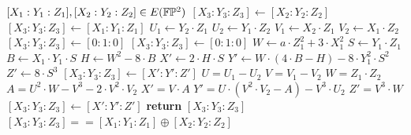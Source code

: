 \begin{algorithm}\caption{Закон сложения в проективной }
\label{alg:projective_group_law}
\begin{algorithmic}[0]
\Require $[X_1:Y_1:Z_1],[X_2:Y_2:Z_2] \in E(\mathbb{F}\mathbb{P}^2)$
\If{$[X_1:Y_1:Z_1] == [0:1:0]$}
  \State $[X_3:Y_3:Z_3] \gets [X_2:Y_2:Z_2]$
\ElsIf{$[X_2:Y_2:Z_2] == [0:1:0]$}
  \State $[X_3:Y_3:Z_3] \gets [X_1:Y_1:Z_1]$
\Else
  \State $U_1 \gets Y_2\cdot Z_1$
  \State $U_2 \gets Y_1\cdot Z_2$
  \State $V_1 \gets X_2\cdot Z_1$
  \State $V_2 \gets X_1\cdot Z_2$
      $[X_3:Y_3:Z_3] \gets [0:1:0]$
    \Else
        $[X_3:Y_3:Z_3] \gets [0:1:0]$
      \Else
        \State $W \gets a\cdot Z_1^2 + 3\cdot X_1^2$
        \State $S \gets Y_1\cdot Z_1$
        \State $B \gets X_1\cdot Y_1\cdot S$
        \State $H \gets W^2 - 8\cdot B$
        \State $X' \gets 2\cdot H\cdot S$
        \State $Y' \gets W\cdot (4\cdot B - H) - 8\cdot Y_1^2\cdot S^2$
        \State $Z' \gets 8\cdot S^3$
        \State $[X_3:Y_3:Z_3] \gets [X':Y':Z']$
      \EndIf
    \EndIf
  \Else
    \State $U = U_1 - U_2$
    \State $V = V_1 - V_2$
    \State $W = Z_1\cdot Z_2$
    \State $A = U^2\cdot W - V^3 - 2\cdot V^2\cdot V_2$
    \State $X' = V\cdot A$
    \State $Y' = U\cdot(V^2\cdot V_2 - A) - V^3\cdot U_2$
    \State $Z' = V^3\cdot W$
    \State $[X_3:Y_3:Z_3]\gets [X':Y':Z']$
  \EndIf
\EndIf
\State \textbf{return} $[X_3:Y_3:Z_3]$
\EndProcedure
\Ensure $ [X_3:Y_3:Z_3] == [X_1:Y_1:Z_1] \oplus [X_2:Y_2:Z_2]$
\end{algorithmic}
\end{algorithm}


